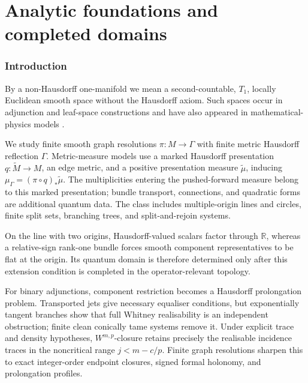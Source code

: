 \documentclass[11pt]{article}
\theoremstyle{plain}
\theoremstyle{definition}
\begin{document}
\vspace{1em}

\tableofcontents
\clearpage
\setlength{\emergencystretch}{3em}

\part{Analytic foundations and completed domains}
\label{part:analytic-foundations}

\section{Introduction}
\label{sec:introduction}

By a non-Hausdorff one-manifold we mean a second-countable, \(T_1\), locally Euclidean smooth space without the Hausdorff axiom. Such spaces occur in adjunction and leaf-space constructions \citep{HaefligerReeb1957,OConnell2023Adjunction,OConnell2024Bundles,LysynskyiMaksymenko2026Line,LysynskyiMaksymenko2026Union,VlasenkoMaksymenko2026} and have also appeared in mathematical-physics models \citep{HellerPysiakSasin11}.

We study finite smooth graph resolutions \(\pi:M\to\Gamma\) with finite metric Hausdorff reflection \(\Gamma\). Metric-measure models use a marked Hausdorff presentation \(q:\widetilde M\to M\), an edge metric, and a positive presentation measure \(\widetilde\mu\), inducing \(\mu_\Gamma=(\pi\circ q)_*\widetilde\mu\). The multiplicities entering the pushed-forward measure belong to this marked presentation; bundle transport, connections, and quadratic forms are additional quantum data. The class includes multiple-origin lines and circles, finite split sets, branching trees, and split-and-rejoin systems.

On the line with two origins, Hausdorff-valued scalars factor through \(\mathbb R\), whereas a relative-sign rank-one bundle forces smooth component representatives to be flat at the origin. Its quantum domain is therefore determined only after this extension condition is completed in the operator-relevant topology.

For binary adjunctions, component restriction becomes a Hausdorff prolongation problem. Transported jets give necessary equaliser conditions, but exponentially tangent branches show that full Whitney realisability is an independent obstruction; finite clean conically tame systems remove it. Under explicit trace and density hypotheses, \(W^{m,p}\)-closure retains precisely the realisable incidence traces in the noncritical range \(j<m-c/p\). Finite graph resolutions sharpen this to exact integer-order endpoint closures, signed formal holonomy, and prolongation profiles.
\end{document}
